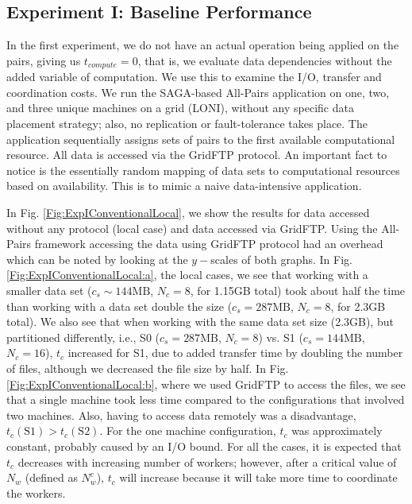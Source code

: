 \documentclass{rspublic}
\begin{document}
\vspace{-0.4cm}

\subsection{Experiment I: Baseline Performance}\label{Sec:gridFTPExp}

\vspace{-0.1cm}

In the first experiment, we do not have an actual operation being
applied on the pairs, giving us $t_{compute}=0$, that is, we evaluate
data dependencies without the added variable of computation. We use
this to examine the I/O, transfer and coordination costs. We run the
SAGA-based All-Pairs application on one, two, and three unique
machines on a grid (LONI), without any specific data placement
strategy; also, no replication or fault-tolerance takes place. The
application sequentially assigns sets of pairs to the first available
computational resource. All data is accessed via the GridFTP
protocol. An important fact to notice is the essentially random
mapping of data sets to computational resources based on
availability. This is to mimic a naive data-intensive application.

In Fig. \ref{Fig:ExpIConventionalLocal}, we show the results for
data accessed without any protocol (local case) and data accessed via
GridFTP. Using the All-Pairs framework accessing the data using
GridFTP protocol had an overhead which can be noted by looking at the
$y-$scales of both graphs. In Fig.
\ref{Fig:ExpIConventionalLocal:a}, the local cases, we see that
working with a smaller data set ($c_s \sim 144\mbox{MB}$, $N_c = 8$, for 1.15GB
total) took about half the time than working with a data set double
the size ($c_s = 287\mbox{MB}$, $N_c = 8$, for 2.3GB total). We also see that
when working with the same data set size (2.3GB), but partitioned
differently, i.e., S0 ($c_s = 287\mbox{MB}$, $N_c = 8$) vs. S1 ($c_s =
144\mbox{MB}$, $N_c = 16$), $t_c$ increased for S1, due to added transfer
time by doubling the number of files, although we decreased the file
size by half. In Fig. \ref{Fig:ExpIConventionalLocal:b}, where we
used GridFTP to access the files, we see that a single machine took
less time compared to the configurations that involved two
machines. Also, having to access data remotely was a disadvantage,
$t_c(\mbox{S1}) > t_c(\mbox{S2})$. For the one machine configuration,
$t_c$ was approximately constant, probably caused by an I/O bound. For
all the cases, it is expected that $t_c$ decreases with increasing
number of workers; however, after a critical value of $N_w$ (defined
as $N^c_w$), $t_c$ will increase because it will take more time to
coordinate the workers.
\end{document}
